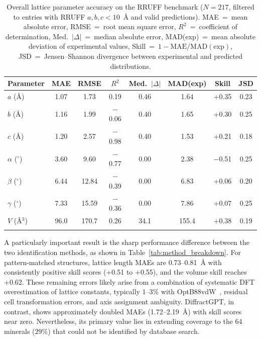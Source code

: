 \documentclass[pdflatex,sn-mathphys-num]{sn-jnl}
\theoremstyle{thmstyleone}
\theoremstyle{thmstyletwo}
\theoremstyle{thmstylethree}
\begin{document}
\begin{table}[h]
\caption{Overall lattice parameter accuracy on the RRUFF benchmark ($N = 217$, filtered to entries with RRUFF $a,b,c < 10$~\AA{} and valid predictions). MAE~=~mean absolute error, RMSE~=~root mean square error, $R^2$~=~coefficient of determination, Med.~$|\Delta|$~=~median absolute error, MAD(exp)~=~mean absolute deviation of experimental values, Skill~=~$1 - \mathrm{MAE}/\mathrm{MAD}(\mathrm{exp})$, JSD~=~Jensen--Shannon divergence between experimental and predicted distributions.}\label{tab:overall_metrics}
\begin{tabular}{@{}lccccccc@{}}
\toprule
Parameter & MAE & RMSE & $R^2$ & Med.\ $|\Delta|$ & MAD(exp) & Skill & JSD \\
\midrule
$a$ (\AA) & 1.07 & 1.73 & 0.19 & 0.46 & 1.64 & +0.35 & 0.23 \\
$b$ (\AA) & 1.16 & 1.99 & $-$0.06 & 0.40 & 1.65 & +0.30 & 0.25 \\
$c$ (\AA) & 1.20 & 2.57 & $-$0.98 & 0.40 & 1.53 & +0.21 & 0.18 \\
$\alpha$ ($^\circ$) & 3.60 & 9.60 & $-$0.77 & 0.00 & 2.38 & $-$0.51 & 0.25 \\
$\beta$ ($^\circ$) & 6.44 & 12.84 & $-$0.39 & 0.00 & 6.83 & +0.06 & 0.20 \\
$\gamma$ ($^\circ$) & 7.33 & 15.59 & $-$0.36 & 0.00 & 7.86 & +0.07 & 0.25 \\
$V$ (\AA$^3$) & 96.0 & 170.7 & 0.26 & 34.1 & 155.4 & +0.38 & 0.19 \\
\botrule
\end{tabular}
\end{table}

A particularly important result is the sharp performance difference between the two identification methods, as shown in Table~\ref{tab:method_breakdown}. For pattern-matched structures, lattice length MAEs are 0.73--0.81~\AA{} with consistently positive skill scores (+0.51 to +0.55), and the volume skill reaches +0.62. These remaining errors likely arise from a combination of systematic DFT overestimation of lattice constants, typically 1--3\% with OptB88vdW~\cite{jarvis2020}, residual cell transformation errors, and axis assignment ambiguity. DiffractGPT, in contrast, shows approximately doubled MAEs (1.72--2.19~\AA) with skill scores near zero. Nevertheless, its primary value lies in extending coverage to the 64 minerals (29\%) that could not be identified by database search.
\end{document}
